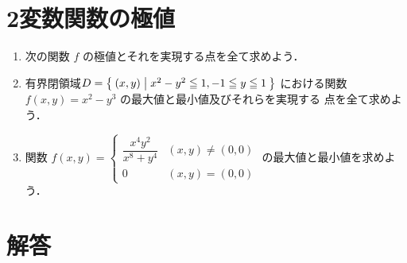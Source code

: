 \documentclass[11pt, uplatex, dvipdfmx, twoside]{jsarticle}
\newcommand{\ds}{\displaystyle}
\begin{document}
\section{2変数関数の極値}\label{sec:extremal}

\begin{enumerate}[label=\arabic{section}.\arabic*]

  \setlength{\itemsep}{1zh}
  
\item 次の関数 $f$ の極値とそれを実現する点を全て求めよう．

  
\item 有界閉領域$D=\Set{(x,y) | x^2-y^2 \leqq 1, -1 \leqq y \leqq 1 }$
  における関数 $f(x,y) = x^2-y^3$ の最大値と最小値及びそれらを実現する
  点を全て求めよう．

\item 関数 $\ds f(x,y) = \left\{
    \begin{array}{cc}
      \dfrac{x^4 y^2}{x^8+y^4} & (x,y) \neq (0,0)\\
       0 & (x,y)=(0,0)
    \end{array}
    \right.$ の最大値と最小値を求めよう．
  
\end{enumerate}

\newpage


\section*{解答}
\end{document}
